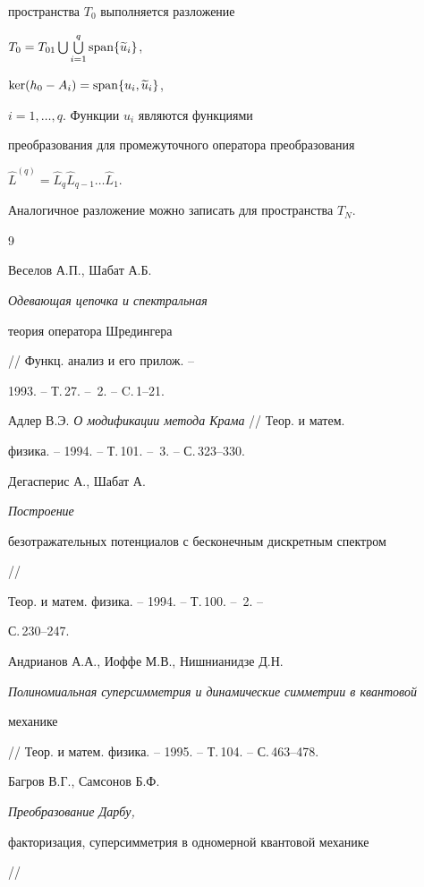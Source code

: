 пространства $T_0$ выполняется разложение


$T_0=T_{01}\bigcup\bigcup\limits_{i=1}^q


\Span\{ \widetilde{u}_i\}$,


$\ker (h_0-A_i)=\operatorname{span}\{ u_i,\widetilde{u}_i\}$,


$i=1,\dotsc ,q$. Функции $u_i$ являются функциями


преобразования для промежуточного оператора преобразования


$\widehat{L}^{(q)}=\widehat{L}_q\widehat{L}_{q-1}\dotsc


\widehat{L}_1$.


Аналогичное разложение можно записать для пространства $T_N$.





\begin{thebibliography}{9}







Веселов А.П., Шабат А.Б. {\it Одевающая цепочка и спектральная


теория оператора Шредингера} // Функц. анализ и его прилож. --


1993. -- Т.\,27. -- \No\,2. --  C.\,1--21.




Адлер В.Э. {\it О модификации метода Крама} // Теор. и матем.


физика. -- 1994. -- Т.\,101. -- \No\,3. -- С.\,323--330.




Дегасперис А., Шабат А. {\it Построение


безотражательных потенциалов с бесконечным дискретным спектром} //


Теор. и матем. физика. -- 1994. -- Т.\,100. -- \No\,2. --


С.\,230--247.




Андрианов А.А., Иоффе М.В., Нишнианидзе Д.Н.


{\it Полиномиальная суперсимметрия и динамические симметрии в квантовой


механике} // Теор. и матем. физика. -- 1995. -- Т.\,104. -- С.\,463--478.




Багров В.Г., Самсонов Б.Ф. {\it Преобразование Дарбу,


факторизация, суперсимметрия в одномерной квантовой механике} //



\end{thebibliography}
